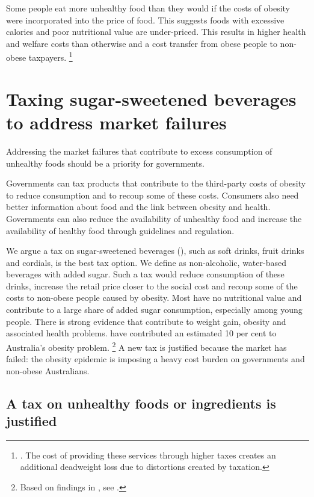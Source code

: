 \documentclass[embargoed]{grattan}
\begin{document}
Some people eat more unhealthy food than they would if the costs of obesity were incorporated into the price of food.
This suggests foods with excessive calories and poor nutritional value are under-priced.
This results in higher health and welfare costs than otherwise and a cost transfer from obese people to non-obese taxpayers.%
\footnote{\textcite{Bhattacharya2011Whopaysobesity}.
The cost of providing these services through higher taxes creates an additional deadweight loss due to distortions created by taxation.}

\chapter{Taxing sugar-sweetened beverages to address market failures}\label{taxing-sugar-sweetened-beverages-to-address-a-market-failure}

Addressing the market failures that contribute to excess consumption of unhealthy foods should be a priority for governments.

Governments can tax products that contribute to the third-party costs of obesity to reduce consumption and to recoup some of these costs.
Consumers also need better information about food and the link between obesity and health.
Governments can also reduce the availability of unhealthy food and increase the availability of healthy food through guidelines and regulation.

We argue a tax on sugar-sweetened beverages (\SSBs{}), such as soft drinks, fruit drinks and cordials, is the best tax option. We define \SSBs{} as non-alcoholic, water-based beverages with added sugar. Such a tax would reduce consumption of these drinks, increase the retail price closer to the social cost and recoup some of the costs to non-obese people caused by obesity.
Most \SSBs{} have no nutritional value and contribute to a large share of added sugar consumption, especially among young people.
There is strong evidence that \SSBs{} contribute to weight gain, obesity and associated health problems.
\SSBs{} have contributed an estimated 10 per cent to Australia's obesity problem.%
\footnote{Based on findings in  \textcite{Woodward-Lopez2010whatextenthave}, see .} A new tax is justified because the market has failed: the obesity epidemic is imposing a heavy cost burden on governments and non-obese Australians.

\section{A tax on unhealthy foods or ingredients is justified}\label{a-tax-on-unhealthy-foods-or-ingredients-is-justified}
\end{document}
